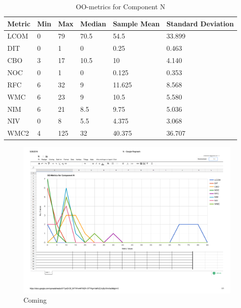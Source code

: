 \begin{table}[]
\centering
\caption{OO-metrics for Component N}
\label{tab:oometrics-netw}
\begin{tabular}{|l|l|l|l|l|l|}
\hline
\textbf{Metric} & \textbf{Min} & \textbf{Max} & \textbf{Median} & \textbf{Sample Mean} & \textbf{Standard Deviation} \\ \hline
LCOM            & 0            & 79           & 70.5            & 54.5                 & 33.899                      \\ \hline
DIT             & 0            & 1            & 0               & 0.25                 & 0.463                       \\ \hline
CBO             & 3            & 17           & 10.5            & 10                   & 4.140                       \\ \hline
NOC             & 0            & 1            & 0               & 0.125                & 0.353                       \\ \hline
RFC             & 6            & 32           & 9               & 11.625               & 8.568                       \\ \hline
WMC             & 6            & 23           & 9               & 10.5                 & 5.580                       \\ \hline
NIM             & 6            & 21           & 8.5             & 9.75                 & 5.036                       \\ \hline
NIV             & 0            & 8            & 5.5             & 4.375                & 3.068                       \\ \hline
WMC2            & 4            & 125          & 32              & 40.375                 & 36.707                      \\ \hline
\end{tabular}
\end{table}


\begin{landscape}
\setlength\LTleft{-.5in}
	\begin{figure}
	\label{fig:netgraph}
	\caption{Coming}
	\centering
	\includegraphics[width=\textwidth]{images/network.pdf}
	\end{figure}
\end{landscape}



